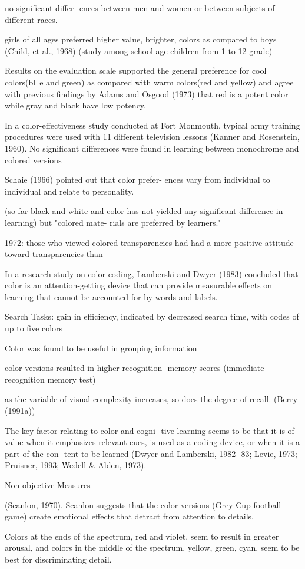 no significant differ- ences between men and women or between subjects of different races.\cite{Pert1996}

girls of all ages preferred higher value, brighter, colors as compared to boys (Child, et al., 1968) \cite{Pert1996} (study among school age children from 1 to 12 grade)

Results on the evaluation scale supported the general preference for cool colors(bl~e and green) as compared with warm colors(red and yellow) and agree with previous findings by Adams and Osgood (1973) that red is a potent color while gray and black have low potency. \cite{Pert1996}

In a color-effectiveness study conducted at Fort Monmouth, typical army training procedures were used with 11 different television lessons (Kanner and Rosenstein, 1960). No significant
differences were found in learning between
monochrome and colored versions \cite{Pert1996}

Schaie (1966) pointed out that color prefer-
ences vary from individual to individual and relate to personality. \cite{Pert1996}

(so far black and white and color has not yielded any significant difference in learning) but "colored mate- rials are preferred by learners." \cite{Pert1996}

1972: those who viewed colored transparencies had had a more positive attitude toward transparencies than \cite{Pert1996}

In a research study on color coding, Lamberski and Dwyer (1983) concluded that color is an attention-getting device that can provide measurable effects on learning that cannot be accounted for by words and labels. \cite{Pert1996}

Search Tasks: 
gain in efficiency, indicated by decreased search time, with codes of up to five colors \cite{Pert1996}

Color was found to be useful in grouping information

color versions resulted in higher recognition- memory scores (immediate recognition memory test)\cite{Pert1996}

as the variable of visual complexity increases, so does the degree of recall. (Berry (1991a)) \cite{Pert1996}

The key factor relating to color and cogni-
tive learning seems to be that it is of value when it emphasizes relevant cues, is used as a coding device, or when it is a part of the con- tent to be learned (Dwyer and Lamberski, 1982- 83; Levie, 1973; Pruisner, 1993; Wedell \& Alden, 1973). \cite{Pert1996}

Non-objective Measures

(Scanlon, 1970). Scanlon suggests that the color versions (Grey Cup football game) create emotional effects that detract from attention to details.







Colors at the ends of the spectrum, red and
violet, seem to result in greater arousal, and
colors in the middle of the spectrum, yellow,
green, cyan, seem to be best for discriminating
detail. \cite{Pert1996}